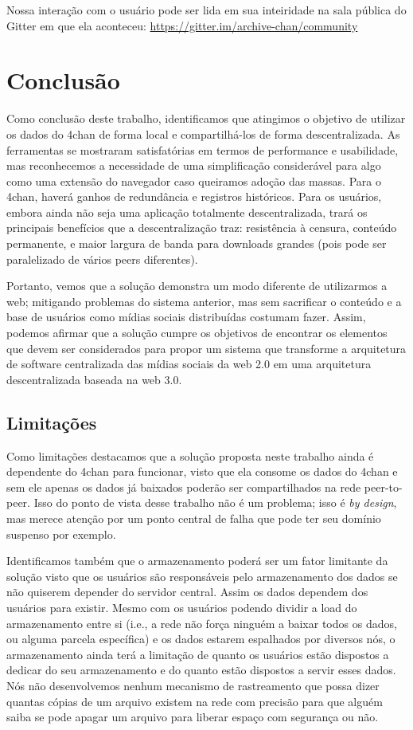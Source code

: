 Nossa interação com o usuário pode ser lida em sua inteiridade na sala pública do Gitter em que ela aconteceu: \url{https://gitter.im/archive-chan/community}

\chapter{Conclusão}

Como conclusão deste trabalho, identificamos que atingimos o objetivo de utilizar os dados do 4chan de forma local e compartilhá-los de forma descentralizada.
As ferramentas se mostraram satisfatórias em termos de performance e usabilidade, mas reconhecemos a necessidade de uma simplificação considerável para algo como uma extensão do navegador caso queiramos adoção das massas.
Para o 4chan, haverá ganhos de redundância e registros históricos.
Para os usuários, embora ainda não seja uma aplicação totalmente descentralizada, trará os principais benefícios que a descentralização traz: resistência à censura, conteúdo permanente, e maior largura de banda para downloads grandes (pois pode ser paralelizado de vários peers diferentes).

Portanto, vemos que a solução demonstra um modo diferente de utilizarmos a web; mitigando problemas do sistema anterior, mas sem sacrificar o conteúdo e a base de usuários como mídias sociais distribuídas costumam fazer.
Assim, podemos afirmar que a solução cumpre os objetivos de encontrar os elementos que devem ser considerados para propor um sistema que transforme a arquitetura de software centralizada das mídias sociais da web 2.0 em uma arquitetura descentralizada baseada na web 3.0.

\section{Limitações}

Como limitações destacamos que a solução proposta neste trabalho ainda é dependente do 4chan para funcionar, visto que ela consome os dados do 4chan e sem ele apenas os dados já baixados poderão ser compartilhados na rede peer-to-peer.
Isso do ponto de vista desse trabalho não é um problema; isso é \textit{by design}, mas merece atenção por um ponto central de falha que pode ter seu domínio suspenso por exemplo.

Identificamos também que o armazenamento poderá ser um fator limitante da solução visto que os usuários são responsáveis pelo armazenamento dos dados se não quiserem depender do servidor central.
Assim os dados dependem dos usuários para existir. Mesmo com os usuários podendo dividir a load do armazenamento entre si (i.e., a rede não força ninguém a baixar todos os dados, ou alguma parcela específica) e os dados estarem espalhados por diversos nós, o armazenamento ainda terá a limitação de quanto os usuários estão dispostos a dedicar do seu armazenamento e do quanto estão dispostos a servir esses dados.
Nós não desenvolvemos nenhum mecanismo de rastreamento que possa dizer quantas cópias de um arquivo existem na rede com precisão para que alguém saiba se pode apagar um arquivo para liberar espaço com segurança ou não.

